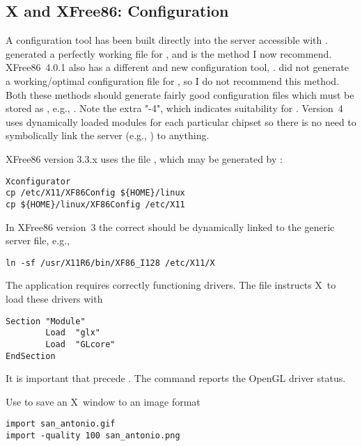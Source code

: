 \documentclass[12pt,twoside]{article}
\begin{document}
\subsection{X and XFree86: Configuration}\label{sxn:x_cnf}
A configuration tool has been built directly into the 
server accessible with .
 generated a perfectly working
 file for , and is the method I now 
recommend. 
XFree86~4.0.1 also has a different and new configuration tool,
. 
 did not generate a working/optimal configuration file
for , so I do not recommend this method.
Both these methods should generate fairly good configuration files
which must be stored as , e.g.,
. 
Note the extra "-4", which indicates suitability for .
Version~4 uses dynamically loaded modules for each particular chipset 
so there is no need to symbolically link the 
server (e.g., ) to anything. 

XFree86 version 3.3.x uses the file ,
which may be generated by :
\begin{verbatim}
Xconfigurator
cp /etc/X11/XF86Config ${HOME}/linux
cp ${HOME}/linux/XF86Config /etc/X11
\end{verbatim}
In XFree86 version~3 the correct  should be
dynamically linked to the generic server file, e.g., 
\begin{verbatim}
ln -sf /usr/X11R6/bin/XF86_I128 /etc/X11/X
\end{verbatim}

The   application requires
correctly functioning  drivers.
The  file instructs X~to load these drivers with
\begin{verbatim}
Section "Module"
        Load  "glx"
        Load  "GLcore"
EndSection
\end{verbatim}
It is important that  precede .
The  command reports the OpenGL driver status.

Use  to save an X~window to an image format
\begin{verbatim}
import san_antonio.gif
import -quality 100 san_antonio.png
\end{verbatim}
\end{document}
